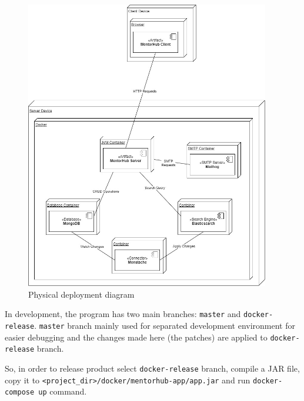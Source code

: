 \documentclass[10pt]{article}
\begin{document}
\begin{figure}[ht!]
    \centering
    \includegraphics[width=0.95\textwidth]{diagram-deployment.jpg}
    \caption{Physical deployment diagram}
    \label{fig:deployment}
\end{figure}

In development, the program has two main branches: \texttt{master} and \texttt{docker-release}.
\texttt{master} branch mainly used for separated development environment for easier debugging 
and the changes made here (the patches) are applied to \texttt{docker-release} branch. 

So, in order to release product select \texttt{docker-release} branch, compile a JAR file, copy
it to \texttt{<project\_dir>/docker/mentorhub-app/app.jar} and run \texttt{docker-compose up}
command.
\end{document}
